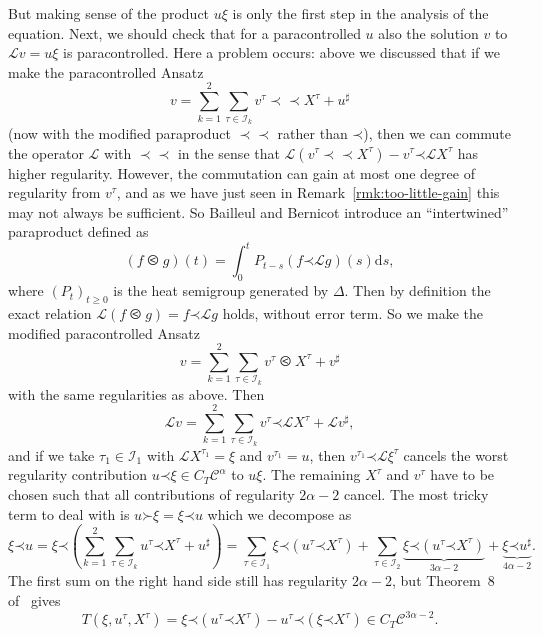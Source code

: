 \documentclass[a4paper, 11pt]{article}
\newcommand{\mathd}{\mathrm{d}}
\newcommand{\tmcolor}[2]{{\color{#1}{#2}}}
\newcommand{\para}{\mathord{\prec}}
\newcommand{\lpara}{\mathord{\succ}}
\newcommand{\mpara}{\mathord{\prec\!\!\!\prec}}
\begin{document}
But making sense of the product $u \xi$ is only the first step in the analysis
of the equation. Next, we should check that for a paracontrolled $u$ also the
solution $v$ to $\mathcal{L}v = u \xi$ is paracontrolled. Here a problem
occurs: above we discussed that if we make the paracontrolled Ansatz
\[ v = \sum_{k = 1}^2 \sum_{\tau \in \mathcal{I}_k} v^{\tau} \mpara
   X^{\tau} + u^{\sharp} \]
(now with the modified paraproduct $\mpara$ rather than $\para$), then we
can commute the operator $\mathcal{L}$ with $\mpara$ in the sense that
$\mathcal{L} (v^{\tau} \mpara X^{\tau}) - v^{\tau} \para
\mathcal{L}X^{\tau}$ has higher regularity. However, the commutation can gain at most
one degree of regularity from $v^{\tau}$, and as we have just seen in
Remark~\ref{rmk:too-little-gain} this may not always be sufficient. So Bailleul
and Bernicot introduce an ``intertwined'' paraproduct
defined as
\[ (f \olessthan g) (t) = \int_0^t P_{t - s} (f \para \mathcal{L}g) (s) \mathd
   s, \]
where $(P_t)_{t \geqslant 0}$ is the heat semigroup generated by $\Delta$.
Then by definition the exact relation $\mathcal{L} (f \olessthan g) = f \para
\mathcal{L}g$ holds, without error term. So we make the modified
paracontrolled Ansatz
\[ v = \sum_{k = 1}^2 \sum_{\tau \in \mathcal{I}_k} v^{\tau} \olessthan
   X^{\tau} + v^{\sharp} \]
with the same regularities as above. Then
\[ \mathcal{L}v = \sum_{k = 1}^2 \sum_{\tau \in \mathcal{I}_k} v^{\tau} \para
   \mathcal{L}X^{\tau} +\mathcal{L}v^{\sharp}, \]
and if we take $\tau_1 \in \mathcal{I}_1$ with $\mathcal{L}X^{\tau_1} = \xi$
and $v^{\tau_1} = u$, then $v^{\tau_1} \para \mathcal{L} \xi^{\tau}$ cancels
the worst regularity contribution $u \para \xi \in C_T \mathcal{C}^{\alpha}$
to $u \xi$. The remaining $X^{\tau}$ and $v^{\tau}$ have to be chosen such
that all contributions of regularity $2 \alpha - 2$ cancel. The most tricky
term to deal with is $u \lpara \xi = \xi \para u$ which we decompose as
\[ \xi \para u = \xi \para \left( \sum_{k = 1}^2 \sum_{\tau \in \mathcal{I}_k}
   u^{\tau} \para X^{\tau} + u^{\sharp} \right) = \sum_{\tau \in
   \mathcal{I}_1} \xi \para (u^{\tau} \para X^{\tau}) + \sum_{\tau \in
   \mathcal{I}_2} \underbrace{\xi \para (u^{\tau} \para X^{\tau})}_{3 \alpha -
   2} + \underbrace{\xi \para u^{\sharp}}_{4 \alpha - 2} . \]
The first sum on the right hand side still has regularity $2 \alpha - 2$, but
Theorem~8 of~\cite{bailleul_higher_2016} gives
\[ T (\xi, u^{\tau}, X^{\tau}) = \xi \para (u^{\tau} \para X^{\tau}) -
   u^{\tau} \para (\xi \para X^{\tau}) \in C_T \mathcal{C}^{3 \alpha - 2} . \]
\end{document}
